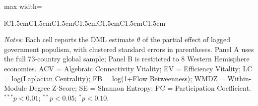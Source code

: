 \begin{table}[!htbp]
\begin{adjustbox}{max width=\textwidth}
\begin{tabular}{lC{1.5cm}C{1.5cm}C{1.5cm}C{1.5cm}C{1.5cm}C{1.5cm}C{1.5cm}}
\bottomrule
\end{tabular}
\end{adjustbox}
\vspace{4pt}
\begin{minipage}{\textwidth}
\footnotesize
\textit{Notes}: Each cell reports the DML estimate $\hat{\theta}$ of the partial effect of lagged government populism, with clustered standard errors in parentheses. Panel A uses the full 73-country global sample; Panel B is restricted to 8 Western Hemisphere economies. ACV = Algebraic Connectivity Vitality; EV = Efficiency Vitality; LC = log(Laplacian Centrality); FB = log(1+Flow Betweenness); WMDZ = Within-Module Degree Z-Score; SE = Shannon Entropy; PC = Participation Coefficient. $^{***}p<0.01$; $^{**}p<0.05$; $^{*}p<0.10$.
\end{minipage}
\end{table}
